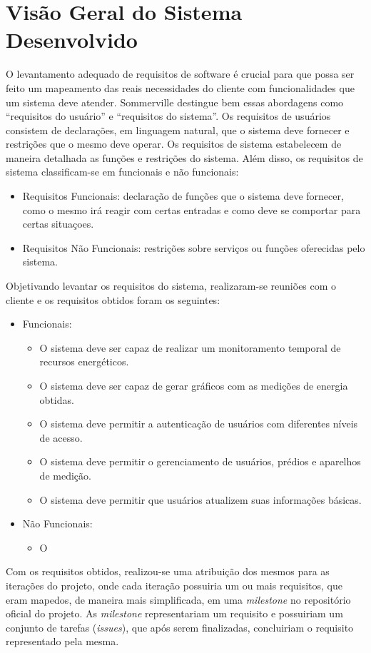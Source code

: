 \chapter{Visão Geral do Sistema Desenvolvido}

O levantamento adequado de requisitos de software é crucial para
que possa ser feito um mapeamento das reais necessidades do cliente com
funcionalidades que um sistema deve atender. Sommerville \cite{sommerville_2006}
destingue bem essas abordagens como ``requisitos do usuário'' e ``requisitos do sistema''. Os requisitos de usuários consistem de declarações, em
linguagem natural, que o sistema deve fornecer e restrições que o mesmo deve
operar. Os requisitos de sistema estabelecem de maneira detalhada as
funções e restrições do sistema. Além disso, os requisitos de sistema
classificam-se em funcionais e não funcionais:

\begin{itemize}
    \item Requisitos Funcionais: declaração de funções que o sistema deve fornecer, como o mesmo irá reagir com certas entradas e como deve se comportar para certas situaçoes.
    \item Requisitos Não Funcionais: restrições sobre serviços ou funções oferecidas pelo sistema.
\end{itemize}

Objetivando levantar os requisitos do sistema, realizaram-se reuniões com o
cliente e os requisitos obtidos foram os seguintes:

\begin{itemize}
    \item Funcionais:
    \begin{itemize}
        \item O sistema deve ser capaz de realizar um monitoramento temporal de recursos energéticos.
        \item O sistema deve ser capaz de gerar gráficos com as medições de energia obtidas.
        \item O sistema deve permitir a autenticação de usuários com diferentes níveis de acesso.
        \item O sistema deve permitir o gerenciamento de usuários, prédios e aparelhos de medição.
        \item O sistema deve permitir que usuários atualizem suas informações básicas.
    \end{itemize}
    \item Não Funcionais:
    \begin{itemize}
        \item O
    \end{itemize}
\end{itemize}

Com os requisitos obtidos, realizou-se uma atribuição dos mesmos para
as iterações do projeto, onde cada iteração possuiria um ou mais requisitos,
que eram mapedos, de maneira mais simplificada, em uma \textit{milestone} no repositório oficial do projeto.
As \textit{milestone} representariam um requisito e possuiriam um conjunto
de tarefas (\textit{issues}), que após serem finalizadas, concluiriam
o requisito representado pela mesma.